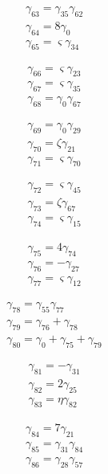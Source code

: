 \[\begin{aligned}\gamma_{63}=\gamma_{35} \gamma_{62}\\ \gamma_{64}=8 \gamma_{0}\\ \gamma_{65}=\varsigma  \gamma_{34}\end{aligned}\]

\[\begin{aligned}\gamma_{66}=\varsigma  \gamma_{23}\\ \gamma_{67}=\varsigma  \gamma_{35}\\ \gamma_{68}=\gamma_{0} \gamma_{67}\end{aligned}\]

\[\begin{aligned}\gamma_{69}=\gamma_{0} \gamma_{29}\\ \gamma_{70}=\zeta  \gamma_{21}\\ \gamma_{71}=\varsigma  \gamma_{70}\end{aligned}\]

\[\begin{aligned}\gamma_{72}=\varsigma  \gamma_{45}\\ \gamma_{73}=\zeta  \gamma_{67}\\ \gamma_{74}=\varsigma  \gamma_{15}\end{aligned}\]

\[\begin{aligned}\gamma_{75}=4 \gamma_{74}\\ \gamma_{76}=- \gamma_{27}\\ \gamma_{77}=\varsigma  \gamma_{12}\end{aligned}\]

\[\begin{aligned}\gamma_{78}=\gamma_{55} \gamma_{77}\\ \gamma_{79}=\gamma_{76} + \gamma_{78}\\ \gamma_{80}=\gamma_{0} + \gamma_{75} + \gamma_{79}\end{aligned}\]

\[\begin{aligned}\gamma_{81}=- \gamma_{31}\\ \gamma_{82}=2 \gamma_{25}\\ \gamma_{83}=\eta  \gamma_{82}\end{aligned}\]

\[\begin{aligned}\gamma_{84}=7 \gamma_{21}\\ \gamma_{85}=\gamma_{31} \gamma_{84}\\ \gamma_{86}=\gamma_{28} \gamma_{57}\end{aligned}\]

